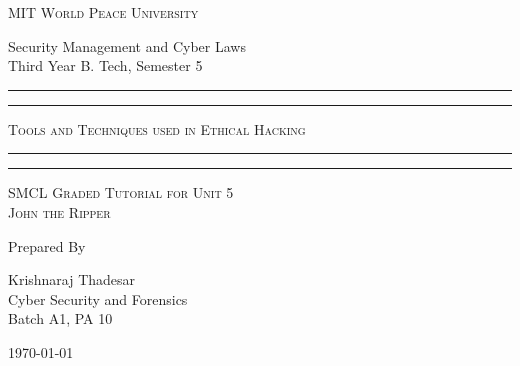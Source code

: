 \documentclass[11pt]{article}
\begin{document}
\begin{titlepage}
    \centering


    \huge\textsc{
        MIT World Peace University
    }\\

    \vspace{0.75\baselineskip} %

    \LARGE{
        Security Management and Cyber Laws\\
        Third Year B. Tech, Semester 5
    }

    \vfill %


    \rule{\textwidth}{1.6pt}\vspace{-\baselineskip}\vspace{2pt}
    \rule{\textwidth}{0.6pt}
    \vspace{0.75\baselineskip} %

    \huge{\textsc{
            Tools and Techniques used in Ethical Hacking
        }} \\

    \vspace{0.5\baselineskip} %
    \rule{\textwidth}{0.6pt}\vspace{-\baselineskip}\vspace{2.8pt}
    \rule{\textwidth}{1.6pt}

    \vspace{1\baselineskip} %


    \LARGE\textsc{
        SMCL Graded Tutorial for Unit 5\\
        John the Ripper
    } %
    \vfill


    Prepared By \vspace{0.5\baselineskip} %

    \Large{
        Krishnaraj Thadesar \\
        Cyber Security and Forensics\\
        Batch A1, PA 10
    }

    \vspace{0.5\baselineskip} %
    \today

\end{titlepage}
\end{document}
